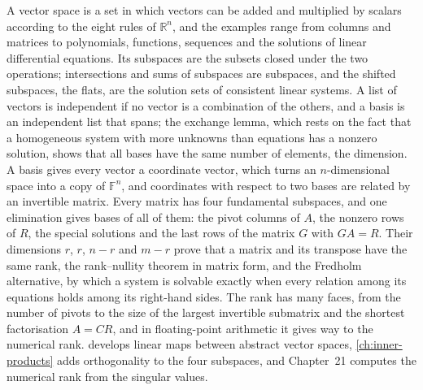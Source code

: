 \bigskip
A vector space is a set in which vectors can be added and multiplied by scalars according to the eight rules of $\mathbb R^n$, and the examples range from columns and matrices to polynomials, functions, sequences and the solutions of linear differential equations. Its subspaces are the subsets closed under the two operations; intersections and sums of subspaces are subspaces, and the shifted subspaces, the flats, are the solution sets of consistent linear systems. A list of vectors is independent if no vector is a combination of the others, and a basis is an independent list that spans; the exchange lemma, which rests on the fact that a homogeneous system with more unknowns than equations has a nonzero solution, shows that all bases have the same number of elements, the dimension. A basis gives every vector a coordinate vector, which turns an $n$-dimensional space into a copy of $\mathbb F^n$, and coordinates with respect to two bases are related by an invertible matrix. Every matrix has four fundamental subspaces, and one elimination gives bases of all of them: the pivot columns of $A$, the nonzero rows of $R$, the special solutions and the last rows of the matrix $G$ with $GA=R$. Their dimensions $r$, $r$, $n-r$ and $m-r$ prove that a matrix and its transpose have the same rank, the rank--nullity theorem in matrix form, and the Fredholm alternative, by which a system is solvable exactly when every relation among its equations holds among its right-hand sides. The rank has many faces, from the number of pivots to the size of the largest invertible submatrix and the shortest factorisation $A=CR$, and in floating-point arithmetic it gives way to the numerical rank.  develops linear maps between abstract vector spaces, \cref{ch:inner-products} adds orthogonality to the four subspaces, and Chapter~21 computes the numerical rank from the singular values.

\chapternotes

